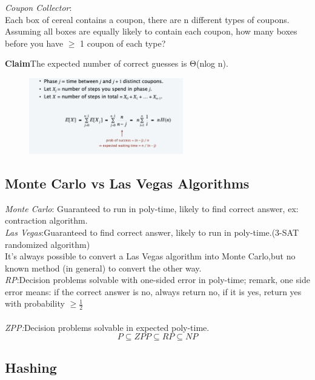 \documentclass[11pt]{article}
\newenvironment{claim}[1]{\par\textbf{Claim}\space#1}{}
\begin{document}
\emph{Coupon Collector}:\\
Each box of cereal contains a coupon, there are n different types of coupons. Assuming all boxes are equally likely to contain each coupon, how many boxes before you have $\geq$ 1 coupon of each type?

\begin{claim}
The expected number of correct guesses is Θ(nlog n).
\end{claim}\\

\begin{figure}[H]
		\centering
		\includegraphics[width=0.6\textwidth ]{coupon}
\end{figure}

\subsection{Monte Carlo vs Las Vegas Algorithms}

\emph{Monte Carlo}: Guaranteed to run in poly-time, likely to find correct answer, ex: contraction algorithm.\\
\emph{Las Vegas}:Guaranteed to find correct answer, likely to run in poly-time.(3-SAT randomized algorithm)\\

It's always possible to convert a Las Vegas algorithm into Monte Carlo,but no known method (in general) to convert the other way.\\

\emph{RP}:Decision problems solvable with one-sided error in poly-time; remark, one side error means: if the correct answer is no, always return no, if it is yes, return yes with probability $\geq \frac{1}{2}$\\\\
\emph{ZPP:}Decision problems solvable in expected poly-time.\\

\[ P \subseteq ZPP \subseteq RP \subseteq NP \]

\subsection{Hashing}
\end{document}
